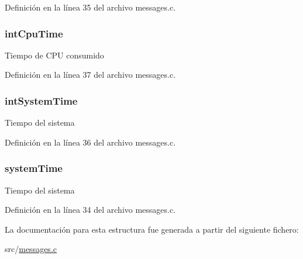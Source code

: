 Definición en la línea 35 del archivo messages.\+c.

\hypertarget{struct_s_t___c_n_t_a61dff6fa53638f76ef2f5c004a58992b}{}
\subsubsection[{int\+Cpu\+Time}]{ int\+Cpu\+Time}\label{struct_s_t___c_n_t_a61dff6fa53638f76ef2f5c004a58992b}
Tiempo de C\+P\+U consumido 

Definición en la línea 37 del archivo messages.\+c.

\hypertarget{struct_s_t___c_n_t_a8c0fad2befd4574e6a7fae46124d5339}{}
\subsubsection[{int\+System\+Time}]{ int\+System\+Time}\label{struct_s_t___c_n_t_a8c0fad2befd4574e6a7fae46124d5339}
Tiempo del sistema 

Definición en la línea 36 del archivo messages.\+c.

\hypertarget{struct_s_t___c_n_t_a9ff17a87e2d5c2c20efd3883fc5e8afd}{}
\subsubsection[{system\+Time}]{ system\+Time}\label{struct_s_t___c_n_t_a9ff17a87e2d5c2c20efd3883fc5e8afd}
Tiempo del sistema 

Definición en la línea 34 del archivo messages.\+c.



La documentación para esta estructura fue generada a partir del siguiente fichero\+:\begin{DoxyCompactItemize}
\item 
src/\hyperlink{messages_8c}{messages.\+c}\end{DoxyCompactItemize}
